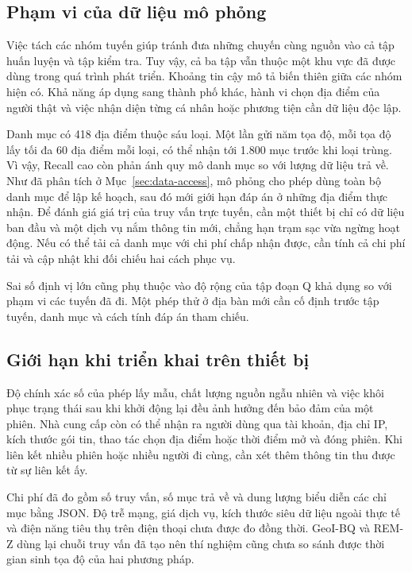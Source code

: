 \subsection{Phạm vi của dữ liệu mô phỏng}
Việc tách các nhóm tuyến giúp tránh đưa những chuyến cùng nguồn vào cả tập huấn luyện và tập kiểm tra. Tuy vậy, cả ba tập vẫn thuộc một khu vực đã được dùng trong quá trình phát triển. Khoảng tin cậy mô tả biến thiên giữa các nhóm hiện có. Khả năng áp dụng sang thành phố khác, hành vi chọn địa điểm của người thật và việc nhận diện từng cá nhân hoặc phương tiện cần dữ liệu độc lập.

Danh mục có 418 địa điểm thuộc sáu loại. Một lần gửi năm tọa độ, mỗi tọa độ lấy tối đa 60 địa điểm mỗi loại, có thể nhận tới 1.800 mục trước khi loại trùng. Vì vậy, Recall cao còn phản ánh quy mô danh mục so với lượng dữ liệu trả về. Như đã phân tích ở Mục~\ref{sec:data-access}, mô phỏng cho phép dùng toàn bộ danh mục để lập kế hoạch, sau đó mới giới hạn đáp án ở những địa điểm thực nhận. Để đánh giá giá trị của truy vấn trực tuyến, cần một thiết bị chỉ có dữ liệu ban đầu và một dịch vụ nắm thông tin mới, chẳng hạn trạm sạc vừa ngừng hoạt động. Nếu có thể tải cả danh mục với chi phí chấp nhận được, cần tính cả chi phí tải và cập nhật khi đối chiếu hai cách phục vụ.

Sai số định vị lớn cũng phụ thuộc vào độ rộng của tập đoạn Q khả dụng so với phạm vi các tuyến đã đi. Một phép thử ở địa bàn mới cần cố định trước tập tuyến, danh mục và cách tính đáp án tham chiếu.

\subsection{Giới hạn khi triển khai trên thiết bị}
Độ chính xác số của phép lấy mẫu, chất lượng nguồn ngẫu nhiên và việc khôi phục trạng thái sau khi khởi động lại đều ảnh hưởng đến bảo đảm của một phiên. Nhà cung cấp còn có thể nhận ra người dùng qua tài khoản, địa chỉ IP, kích thước gói tin, thao tác chọn địa điểm hoặc thời điểm mở và đóng phiên. Khi liên kết nhiều phiên hoặc nhiều người đi cùng, cần xét thêm thông tin thu được từ sự liên kết ấy.

Chi phí đã đo gồm số truy vấn, số mục trả về và dung lượng biểu diễn các chỉ mục bằng JSON. Độ trễ mạng, giá dịch vụ, kích thước siêu dữ liệu ngoài thực tế và điện năng tiêu thụ trên điện thoại chưa được đo đồng thời. GeoI-BQ và REM-Z dùng lại chuỗi truy vấn đã tạo nên thí nghiệm cũng chưa so sánh được thời gian sinh tọa độ của hai phương pháp.

